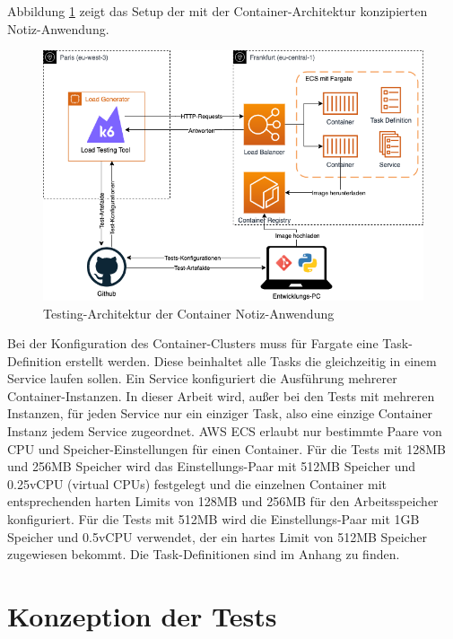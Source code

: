 Abbildung \ref{fig:fargate-testing-architektur} zeigt das Setup der mit der Container-Architektur konzipierten Notiz-Anwendung.

\begin{figure}[H]
    \includegraphics[width=\textwidth]{img/fargate-testing-architektur.png}
    \caption[Testing-Architektur der Container Notiz-Anwendung]{Testing-Architektur der Container Notiz-Anwendung}
    \label{fig:fargate-testing-architektur}
\end{figure}

Bei der Konfiguration des Container-Clusters muss für Fargate eine Task-Definition erstellt werden. Diese beinhaltet alle Tasks die gleichzeitig in einem Service laufen sollen. Ein Service konfiguriert die Ausführung mehrerer Container-Instanzen. In dieser Arbeit wird, außer bei den Tests mit mehreren Instanzen, für jeden Service nur ein einziger Task, also eine einzige Container Instanz jedem Service zugeordnet. AWS ECS erlaubt nur bestimmte Paare von CPU und Speicher-Einstellungen für einen Container. Für die Tests mit 128MB und 256MB Speicher wird das Einstellungs-Paar mit 512MB Speicher und 0.25vCPU (virtual CPUs) festgelegt und die einzelnen Container mit entsprechenden harten Limits von 128MB und 256MB für den Arbeitsspeicher konfiguriert. Für die Tests mit 512MB wird die Einstellungs-Paar mit 1GB Speicher und 0.5vCPU verwendet, der ein hartes Limit von 512MB Speicher zugewiesen bekommt. Die Task-Definitionen sind im Anhang zu finden.

\section{Konzeption der Tests}

